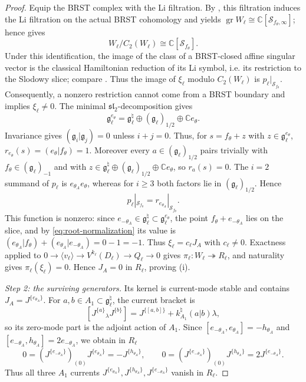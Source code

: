 \documentclass[11pt]{article}
\newcommand{\g}{\mathfrak g}
\begin{document}
\begin{proof}
Equip the BRST complex with the Li filtration.  By
\cite[Theorem~4.5.9]{Arakawa2015}, this filtration induces the Li
filtration on the actual BRST cohomology and yields
$\operatorname{gr} W_\ell\cong\mathbb C[\mathcal S_{f_\theta,\infty}]$;
hence \cite[Corollary~4.5.10]{Arakawa2015} gives
$$
 W_\ell/C_2(W_\ell)\cong \mathbb C[\mathcal S_{f_\theta}].
$$
Under this identification, the image of the class of a BRST-closed affine
singular vector is the classical Hamiltonian reduction of its Li symbol,
i.e. its restriction to the Slodowy slice; compare
\cite[Lemma~7.3]{ArakawaMoreau}.  Thus the image of $\xi_\ell$ modulo
$C_2(W_\ell)$ is $p_\ell|_{\mathcal S_{f_\theta}}$.  Consequently, a
nonzero restriction cannot come from a BRST boundary and implies
$\xi_\ell\ne0$.
The minimal $\mathfrak{sl}_2$-decomposition gives
$$
 \g_\ell^{e_\theta}
 =\g_\ell^\natural\oplus(\g_\ell)_{1/2}\oplus\mathbb Ce_\theta.
$$
Invariance gives $(\g_i|\g_j)=0$ unless $i+j=0$.  Thus, for
$s=f_\theta+z$ with $z\in\g_\ell^{e_\theta}$,
$r_{e_\theta}(s)=(e_\theta|f_\theta)=1$.  Moreover every
$a\in(\g_\ell)_{1/2}$ pairs trivially with $f_\theta\in(\g_\ell)_{-1}$
and with $z\in\g_\ell^\natural\oplus(\g_\ell)_{1/2}\oplus
\mathbb Ce_\theta$, so $r_a(s)=0$.  The $i=2$ summand of $p_\ell$ is
$e_{\theta_A}e_\theta$, whereas for $i\ge3$ both factors lie in
$(\g_\ell)_{1/2}$.  Hence
$$
 p_\ell|_{\mathcal S_{f_\theta}}=r_{e_{\theta_A}}|_{\mathcal S_{f_\theta}}.
$$
This function is nonzero: since $e_{-\theta_A}\in\g_\ell^\natural
\subset\g_\ell^{e_\theta}$, the point $f_\theta+e_{-\theta_A}$ lies
on the slice, and by \eqref{eq:root-normalization} its value is
$(e_{\theta_A}|f_\theta)+(e_{\theta_A}|e_{-\theta_A})=0-1=-1$.
Thus $\xi_\ell=c_\ell J_A$ with $c_\ell\ne0$.  Exactness applied to
$0\to\langle v_\ell\rangle\to V^{k_\ell}(D_\ell)\to Q_\ell\to0$ gives
$\pi_\ell:W_\ell\twoheadrightarrow R_\ell$, and naturality gives
$\pi_\ell(\xi_\ell)=0$.  Hence $J_A=0$ in $R_\ell$, proving \textup{(i)}.

\smallskip
\noindent\emph{Step 2: the surviving generators.}
Its kernel is current-mode stable and contains $J_A=J^{\{e_{\theta_A}\}}$.  For $a,b\in A_1\subset\g_\ell^\natural$, the current bracket is
$$
 [J^{\{a\}}{}_{\lambda}J^{\{b\}}]
 =J^{\{[a,b]\}}+k^\natural_{A_1}(a|b)\lambda,
$$
so its zero-mode part is the adjoint action of $A_1$.  Since
$[e_{-\theta_A},e_{\theta_A}]=-h_{\theta_A}$ and
$[e_{-\theta_A},h_{\theta_A}]=2e_{-\theta_A}$, we obtain in $R_\ell$
$$
 0=(J^{\{e_{-\theta_A}\}})_{(0)}J^{\{e_{\theta_A}\}}
   =-J^{\{h_{\theta_A}\}},
 \qquad
 0=(J^{\{e_{-\theta_A}\}})_{(0)}J^{\{h_{\theta_A}\}}
   =2J^{\{e_{-\theta_A}\}}.
$$
Thus all three $A_1$ currents
$J^{\{e_{\theta_A}\}},J^{\{h_{\theta_A}\}},J^{\{e_{-\theta_A}\}}$
vanish in $R_\ell$.


\end{proof}
\end{document}
